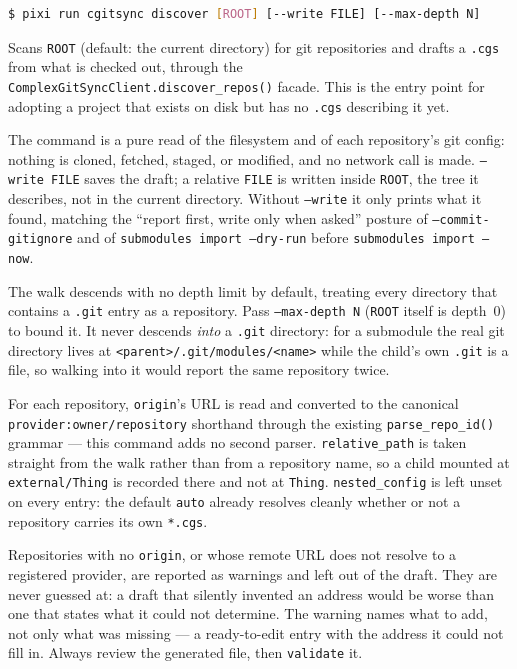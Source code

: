 \begin{lstlisting}[language=bash]
$ pixi run cgitsync discover [ROOT] [--write FILE] [--max-depth N]
\end{lstlisting}

Scans \texttt{ROOT} (default: the current directory) for git repositories
and drafts a \texttt{.cgs} from what is checked out, through the
\texttt{ComplexGitSyncClient.discover\_repos()} facade. This is the entry
point for adopting a project that exists on disk but has no \texttt{.cgs}
describing it yet.

The command is a pure read of the filesystem and of each repository's git
config: nothing is cloned, fetched, staged, or modified, and no network
call is made. \texttt{--write FILE} saves the draft; a relative
\texttt{FILE} is written inside \texttt{ROOT}, the tree it describes, not
in the current directory. Without \texttt{--write} it only prints what it found,
matching the ``report first, write only when asked'' posture of
\texttt{--commit-gitignore} and of \texttt{submodules import --dry-run}
before \texttt{submodules import --now}.

The walk descends with no depth limit by default, treating every directory
that contains a \texttt{.git} entry as a repository. Pass
\texttt{--max-depth N} (\texttt{ROOT} itself is depth~0) to bound it. It
never descends \emph{into} a \texttt{.git} directory: for a submodule the
real git directory lives at \texttt{<parent>/.git/modules/<name>} while the
child's own \texttt{.git} is a file, so walking into it would report the
same repository twice.

For each repository, \texttt{origin}'s URL is read and converted to the
canonical \texttt{provider:owner/repository} shorthand through the existing
\texttt{parse\_repo\_id()} grammar --- this command adds no second parser.
\texttt{relative\_path} is taken straight from the walk rather than from a
repository name, so a child mounted at \texttt{external/Thing} is recorded
there and not at \texttt{Thing}. \texttt{nested\_config} is left unset on
every entry: the default \texttt{auto} already resolves cleanly whether or
not a repository carries its own \texttt{*.cgs}.

Repositories with no \texttt{origin}, or whose remote URL does not resolve
to a registered provider, are reported as warnings and left out of the
draft. They are never guessed at: a draft that silently invented an address
would be worse than one that states what it could not determine. The
warning names what to add, not only what was missing --- a ready-to-edit
entry with the address it could not fill in. Always review the generated
file, then \texttt{validate} it.


